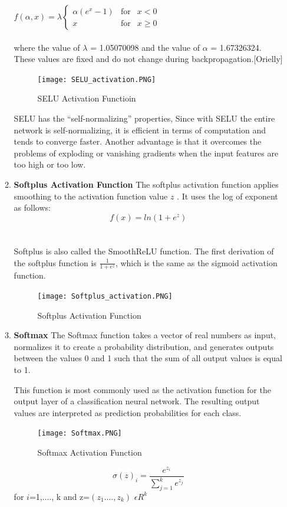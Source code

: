 \begin{itemize}
\begin{enumerate}
    $f(\alpha,x)=\lambda\left\{\begin{array}{rcl}
         \alpha (e^{x}-1) & \mbox{for} & x<0\\
          x & \mbox{for} & x\geq 0
    \end{array}\right.$\\
    \\
    where the value of $\lambda$ = 1.05070098 and the value of $\alpha$ = 1.67326324. These values are fixed and do not change during backpropagation.[Orielly]
    \begin{figure}[H]
        \centering\texttt{[image: SELU\_activation.PNG]}
        \caption{SELU Activation Functioin}
    \end{figure}
    
    SELU has the “self-normalizing” properties, Since with SELU the entire network is self-normalizing, it is efficient in terms of computation and tends to converge faster. Another advantage is that it overcomes the problems of exploding or vanishing gradients when the input features are too high or too low.
    \item \textbf{Softplus Activation Function}
    The softplus activation function applies smoothing to the activation function value 
    \(z\) . It uses the log of exponent as follows:\\
    
    $$f(x)=ln(1+e^{z})$$\\
    \\
    Softplus is also called the SmoothReLU function. The first derivation of the softplus function is  $\frac{1}{1+e^{z}}$, which is the same as the sigmoid activation function. 
    
    \begin{figure}[H]
        \centering\texttt{[image: Softplus\_activation.PNG]}
        \caption{Softplus Activation Function}
    \end{figure}
    \item \textbf{Softmax}
    The Softmax function takes a vector of real numbers as input, normalizes it to create a probability distribution, and generates outputs between the values 0 and 1 such that the sum of all output values is equal to 1. 
    
    This function is most commonly used as the activation function for the output layer of a classification neural network. The resulting output values are interpreted as prediction probabilities for each class.
    \begin{figure}[H]
        \centering\texttt{[image: Softmax.PNG]}
        \caption{Softmax Activation Function}
    \end{figure}
    $$\sigma(z)_{i}=\frac{e^{z_{i}}}{\sum_{j=1}^{k}e^{z_{j}}}$$ for \(i\)=1,...., k and z=$(z_{1}....,z_{k})$ $\epsilon R^{k}$
    \end{enumerate}
\end{itemize}

